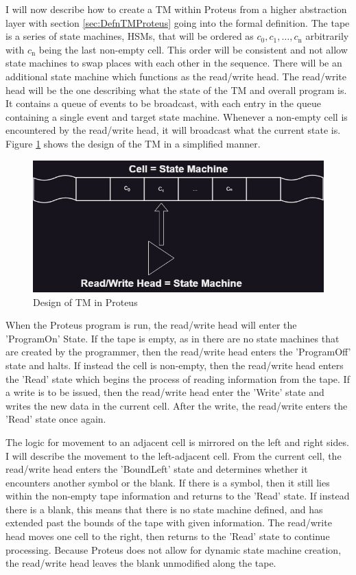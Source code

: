 I will now describe how to create a TM within Proteus from a higher abstraction layer with section \ref{sec:DefnTMProteus} going into the formal definition.
The tape is a series of state machines, HSMs, that will be ordered as $c_{0}, c_{1}, \dots , c_{\text{n}}$ arbitrarily with $c_{\text{n}}$ being the last non-empty cell.
This order will be consistent and not allow state machines to swap places with each other in the sequence.
There will be an additional state machine which functions as the read/write head.
The read/write head will be the one describing what the state of the TM and overall program is.
It contains a queue of events to be broadcast, with each entry in the queue containing a single event and target state machine.
Whenever a non-empty cell is encountered by the read/write head, it will broadcast what the current state is.
Figure \ref{fig:ProteusTMDesign} shows the design of the TM in a simplified manner.

\begin{figure}[h!]
    \centering
    \includegraphics[width=16cm]{images/ProteusTMDesign.png}
       \caption{Design of TM in Proteus}
           \label{fig:ProteusTMDesign}
\end{figure}

When the Proteus program is run, the read/write head will enter the 'ProgramOn' State.
If the tape is empty, as in there are no state machines that are created by the programmer, then the read/write head enters the 'ProgramOff' state and halts.
If instead the cell is non-empty, then the read/write head enters the 'Read' state which begins the process of reading information from the tape.
If a write is to be issued, then the read/write head enter the 'Write' state and writes the new data in the current cell.
After the write, the read/write enters the 'Read' state once again.

The logic for movement to an adjacent cell is mirrored on the left and right sides.
I will describe the movement to the left-adjacent cell.
From the current cell, the read/write head enters the 'BoundLeft' state and determines whether it encounters another symbol or the blank.
If there is a symbol, then it still lies within the non-empty tape information and returns to the 'Read' state.
If instead there is a blank, this means that there is no state machine defined, and has extended past the bounds of the tape with given information.
The read/write head moves one cell to the right, then returns to the 'Read' state to continue processing.
Because Proteus does not allow for dynamic state machine creation, the read/write head leaves the blank unmodified along the tape.


